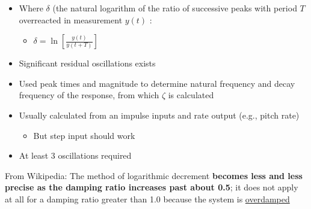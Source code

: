 \documentclass[10pt]{report}
\begin{document}
\begin{itemize}
\item Where $\delta$ (the natural logarithm of the ratio of successive peaks with period $T$ overreacted in measurement $y(t)$ :
\begin{itemize}
\item $\delta = \ln\left[\frac{y(t)}{y(t+T)}\right]$

\end{itemize}
\item Significant residual oscillations exists

\item Used peak times and magnitude to determine natural frequency and decay frequency of the response, from which $\zeta$ is calculated

\item Usually calculated from an impulse inputs and rate output (e.g., pitch rate)

\begin{itemize}
\item But step input should work

\end{itemize}
\item At least 3 oscillations required

\end{itemize}

\begin{advtcolorbox}
From Wikipedia: The method of logarithmic decrement \textbf{becomes less and less precise as the damping ratio increases past about 0.5}; it does not apply at all for a damping ratio greater than 1.0 because the system is \href{https://en.m.wikipedia.org/wiki/Overdamped}{overdamped}

\end{advtcolorbox}
\end{document}
